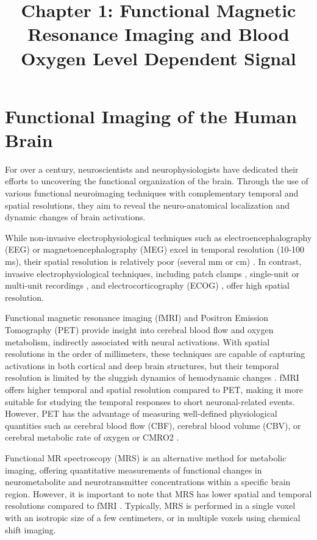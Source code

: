 \title{Chapter 1: Functional Magnetic Resonance Imaging and Blood Oxygen Level Dependent Signal}
\label{cha:intro}

\section{Functional Imaging of the Human Brain}

For over a century, neuroscientists and neurophysiologists have dedicated their
efforts to uncovering the functional organization of the brain. Through the use
of various functional neuroimaging techniques with complementary temporal and
spatial resolutions, they aim to reveal the neuro-anatomical localization and
dynamic changes of brain activations.

While non-invasive electrophysiological techniques such as
electroencephalography (EEG) or magnetoencephalography (MEG) excel in temporal
resolution (10-100 ms), their spatial resolution is relatively poor (several mm
or cm)
\citep{Baillet2001Electromagneticbrainmapping,Haemaelaeinen1993Magnetoencephalographytheoryinstrumentationapplications}.
In contrast, invasive electrophysiological techniques, including patch clamps
\citep{Neher1978extracellularpatchclamp}, single-unit or multi-unit recordings
\citep{Arieli1995Coherentspatiotemporalpatterns}, and electrocorticography
(ECOG)
\citep{Miller2007Realtimefunctional,Nir2008Interhemisphericcorrelationsslow},
offer high spatial resolution.

Functional magnetic resonance imaging (fMRI) and Positron Emission Tomography
(PET) provide insight into cerebral blood flow and oxygen metabolism, indirectly
associated with neural activations. With spatial resolutions in the order of
millimeters, these techniques are capable of capturing activations in both
cortical and deep brain structures, but their temporal resolution is limited by
the sluggish dynamics of hemodynamic changes
\citep{Dale2001Spatiotemporalmappingbrain}. fMRI offers higher temporal and
spatial resolution compared to PET, making it more suitable for
studying the temporal responses to short neuronal-related events. However, PET
has the advantage of measuring well-defined physiological quantities such as
cerebral blood flow (CBF), cerebral blood volume (CBV), or cerebral metabolic
rate of oxygen or CMRO2
\citep{Fox1986Mappinghumanvisual,Friston1993FunctionalConnectivityPrincipal}.

Functional MR spectroscopy (MRS) is an alternative method for metabolic imaging,
offering quantitative measurements of functional changes in neurometabolite and
neurotransmitter concentrations within a specific brain region. However, it is
important to note that MRS has lower spatial and temporal resolutions compared
to fMRI \citep{Morris1999Magneticresonanceimaging}. Typically, MRS is performed
in a single voxel with an isotropic size of a few centimeters, or in multiple
voxels using chemical shift imaging.

